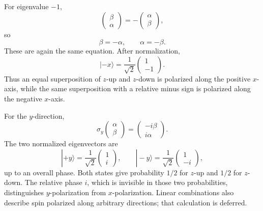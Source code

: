 For eigenvalue \(-1\),
\begin{equation}
\begin{pmatrix}
\beta\\
\alpha
\end{pmatrix}
=
-
\begin{pmatrix}
\alpha\\
\beta
\end{pmatrix},
\end{equation}
so
\begin{equation}
\beta=-\alpha,
\qquad
\alpha=-\beta.
\end{equation}
These are again the same equation. After normalization,
\begin{equation}
|-x\rangle
=
\frac{1}{\sqrt2}
\begin{pmatrix}
1\\
-1
\end{pmatrix}.
\end{equation}
Thus an equal superposition of \(z\)-up and \(z\)-down is polarized along the positive \(x\)-axis, while the same superposition with a relative minus sign is polarized along the negative \(x\)-axis.

For the \(y\)-direction,
\begin{equation}
\sigma_y
\begin{pmatrix}
\alpha\\
\beta
\end{pmatrix}
=
\begin{pmatrix}
-i\beta\\
i\alpha
\end{pmatrix}.
\end{equation}
The two normalized eigenvectors are
\begin{equation}
|+y\rangle
=
\frac{1}{\sqrt2}
\begin{pmatrix}
1\\
i
\end{pmatrix},
\qquad
|-y\rangle
=
\frac{1}{\sqrt2}
\begin{pmatrix}
1\\
-i
\end{pmatrix},
\end{equation}
up to an overall phase. Both states give probability \(1/2\) for \(z\)-up and \(1/2\) for \(z\)-down. The relative phase \(i\), which is invisible in those two probabilities, distinguishes \(y\)-polarization from \(x\)-polarization. Linear combinations also describe spin polarized along arbitrary directions; that calculation is deferred.

